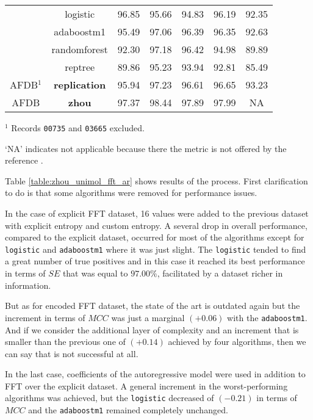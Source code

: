 \begin{table}[h]
\begin{center}
\begin{threeparttable}
\begin{tabular}{c c c c c c c}
  & logistic & 96.85 & 95.66 & 94.83 & 96.19 & 92.35 \\
  & adaboostm1 & 95.49 & 97.06 & 96.39 & 96.35 & 92.63 \\
  & randomforest & 92.30 & 97.18 & 96.42 & 94.98 & 89.89 \\
  & reptree & 89.86 & 95.23 & 93.94 & 92.81 & 85.49 \\
  \hline
  AFDB$^1$ & \textbf{replication} & 95.94 & 97.23 & 96.61 & 96.65 & 93.23 \\
  \hline
  AFDB & \textbf{zhou} & 97.37 & 98.44 & 97.89 & 97.99 & NA \\
  \bottomrule
\end{tabular}
\begin{tablenotes}
	\item $^1$ Records \verb|00735| and \verb|03665| excluded.
 	\item ‘NA’ indicates not applicable because there the metric is not offered by the reference \cite{zhou2015}.
    \end{tablenotes}
\end{threeparttable}
\end{center}
\end{table}
Table \ref{table:zhou_unimol_fft_ar} shows results of the process. First clarification to do is that some algorithms were removed for performance issues.

In the case of explicit FFT dataset, 16 values were added to the previous dataset with explicit entropy and custom entropy. A several drop in overall performance, compared to the explicit dataset, occurred for most of the algorithms except for \verb|logistic| and \verb|adaboostm1| where it was just slight. The \verb|logistic| tended to find a great number of true positives and in this case it reached its best performance in terms of $SE$ that was equal to $97.00\%$, facilitated by a dataset richer in information.

But as for encoded FFT dataset, the state of the art is outdated again but the increment in terms of $MCC$ was just a marginal $(+0.06)$ with the \verb|adaboostm1|. And if we consider the additional layer of complexity and an increment that is smaller than the previous one of $(+0.14)$ achieved by four algorithms, then we can say that is not successful at all.

In the last case, coefficients of the autoregressive model were used in addition to FFT over the explicit dataset. A general increment in the worst-performing algorithms was achieved, but the \verb|logistic| decreased of $(-0.21)$ in terms of $MCC$ and the \verb|adaboostm1| remained completely unchanged. 

